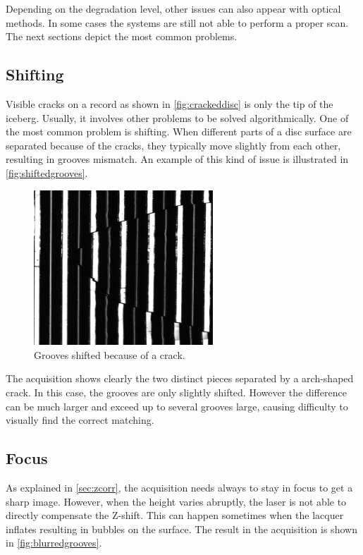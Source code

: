 Depending on the degradation level, other issues can also appear with optical methods. In some cases the systems are still not able to perform a proper scan. The next sections depict the most common problems.

\subsection{Shifting}
\label{sec:issueshift}

Visible cracks on a record as shown in \autoref{fig:crackeddisc} is only the tip of the iceberg. Usually, it involves other problems to be solved algorithmically. One of the most common problem is shifting. When different parts of a disc surface are separated because of the cracks, they typically move slightly from each other, resulting in grooves mismatch. An example of this kind of issue is illustrated in \autoref{fig:shiftedgrooves}.

\begin{figure}[!ht]
\centering
\includegraphics[width=0.6\textwidth]{images/shifted-grooves}
\caption{Grooves shifted because of a crack.}
\label{fig:shiftedgrooves}
\end{figure}

The acquisition shows clearly the two distinct pieces separated by a arch-shaped crack. In this case, the grooves are only slightly shifted. However the difference can be much larger and exceed up to several grooves large, causing difficulty to visually find the correct matching.

\subsection{Focus}

As explained in \autoref{sec:zcorr}, the acquisition needs always to stay in focus to get a sharp image. However, when the height varies abruptly, the laser is not able to directly compensate the Z-shift. This can happen sometimes when the lacquer inflates resulting in bubbles on the surface. The result in the acquisition is shown in \autoref{fig:blurredgrooves}.

